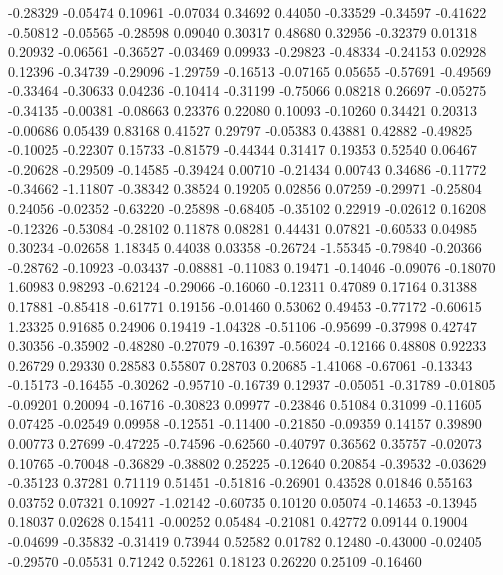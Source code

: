   -0.28329 -0.05474
   0.10961 -0.07034
   0.34692  0.44050
  -0.33529 -0.34597
  -0.41622 -0.50812
  -0.05565 -0.28598
   0.09040  0.30317
   0.48680  0.32956
  -0.32379  0.01318
   0.20932 -0.06561
  -0.36527 -0.03469
   0.09933 -0.29823
  -0.48334 -0.24153
   0.02928  0.12396
  -0.34739 -0.29096
  -1.29759 -0.16513
  -0.07165  0.05655
  -0.57691 -0.49569
  -0.33464 -0.30633
   0.04236 -0.10414
  -0.31199 -0.75066
   0.08218  0.26697
  -0.05275 -0.34135
  -0.00381 -0.08663
   0.23376  0.22080
   0.10093 -0.10260
   0.34421  0.20313
  -0.00686  0.05439
   0.83168  0.41527
   0.29797 -0.05383
   0.43881  0.42882
  -0.49825 -0.10025
  -0.22307  0.15733
  -0.81579 -0.44344
   0.31417  0.19353
   0.52540  0.06467
  -0.20628 -0.29509
  -0.14585 -0.39424
   0.00710 -0.21434
   0.00743  0.34686
  -0.11772 -0.34662
  -1.11807 -0.38342
   0.38524  0.19205
   0.02856  0.07259
  -0.29971 -0.25804
   0.24056 -0.02352
  -0.63220 -0.25898
  -0.68405 -0.35102
   0.22919 -0.02612
   0.16208 -0.12326
  -0.53084 -0.28102
   0.11878  0.08281
   0.44431  0.07821
  -0.60533  0.04985
   0.30234 -0.02658
   1.18345  0.44038
   0.03358 -0.26724
  -1.55345 -0.79840
  -0.20366 -0.28762
  -0.10923 -0.03437
  -0.08881 -0.11083
   0.19471 -0.14046
  -0.09076 -0.18070
   1.60983  0.98293
  -0.62124 -0.29066
  -0.16060 -0.12311
   0.47089  0.17164
   0.31388  0.17881
  -0.85418 -0.61771
   0.19156 -0.01460
   0.53062  0.49453
  -0.77172 -0.60615
   1.23325  0.91685
   0.24906  0.19419
  -1.04328 -0.51106
  -0.95699 -0.37998
   0.42747  0.30356
  -0.35902 -0.48280
  -0.27079 -0.16397
  -0.56024 -0.12166
   0.48808  0.92233
   0.26729  0.29330
   0.28583  0.55807
   0.28703  0.20685
  -1.41068 -0.67061
  -0.13343 -0.15173
  -0.16455 -0.30262
  -0.95710 -0.16739
   0.12937 -0.05051
  -0.31789 -0.01805
  -0.09201  0.20094
  -0.16716 -0.30823
   0.09977 -0.23846
   0.51084  0.31099
  -0.11605  0.07425
  -0.02549  0.09958
  -0.12551 -0.11400
  -0.21850 -0.09359
   0.14157  0.39890
   0.00773  0.27699
  -0.47225 -0.74596
  -0.62560 -0.40797
   0.36562  0.35757
  -0.02073  0.10765
  -0.70048 -0.36829
  -0.38802  0.25225
  -0.12640  0.20854
  -0.39532 -0.03629
  -0.35123  0.37281
   0.71119  0.51451
  -0.51816 -0.26901
   0.43528  0.01846
   0.55163  0.03752
   0.07321  0.10927
  -1.02142 -0.60735
   0.10120  0.05074
  -0.14653 -0.13945
   0.18037  0.02628
   0.15411 -0.00252
   0.05484 -0.21081
   0.42772  0.09144
   0.19004 -0.04699
  -0.35832 -0.31419
   0.73944  0.52582
   0.01782  0.12480
  -0.43000 -0.02405
  -0.29570 -0.05531
   0.71242  0.52261
   0.18123  0.26220
   0.25109 -0.16460
